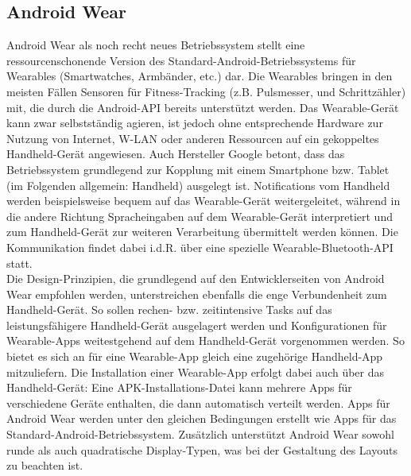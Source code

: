 \subsection{Android Wear}
Android Wear als noch recht neues Betriebssystem stellt eine ressourcenschonende Version des Standard-Android-Betriebssystems für Wearables (Smartwatches, Armbänder, etc.) dar. Die Wearables bringen in den meisten Fällen Sensoren für Fitness-Tracking (z.B. Pulsmesser, und Schrittzähler) mit, die durch die Android-API bereits unterstützt werden. Das Wearable-Gerät kann zwar selbstständig agieren, ist jedoch ohne entsprechende Hardware zur Nutzung von Internet, W-LAN oder anderen Ressourcen auf ein gekoppeltes Handheld-Gerät angewiesen. Auch Hersteller Google betont, dass das Betriebssystem grundlegend zur Kopplung mit einem Smartphone bzw. Tablet (im Folgenden allgemein: Handheld) ausgelegt ist. Notifications vom Handheld werden beispielsweise bequem auf das Wearable-Gerät weitergeleitet, während in die andere Richtung Spracheingaben auf dem Wearable-Gerät interpretiert und zum Handheld-Gerät zur weiteren Verarbeitung übermittelt werden können. Die Kommunikation findet dabei i.d.R. über eine spezielle Wearable-Bluetooth-API statt.
\\[0.5cm]
Die Design-Prinzipien, die grundlegend auf den Entwicklerseiten von Android Wear\cite{android-wear-dev} empfohlen werden, unterstreichen ebenfalls die enge Verbundenheit zum Handheld-Gerät. So sollen rechen- bzw. zeitintensive Tasks auf das leistungsfähigere Handheld-Gerät ausgelagert werden und Konfigurationen für Wearable-Apps weitestgehend auf dem Handheld-Gerät vorgenommen werden. So bietet es sich an für eine Wearable-App gleich eine zugehörige Handheld-App mitzuliefern. Die Installation einer Wearable-App erfolgt dabei auch über das Handheld-Gerät: Eine APK-Installations-Datei kann mehrere Apps für verschiedene Geräte enthalten, die dann automatisch verteilt werden. Apps für Android Wear werden unter den gleichen Bedingungen erstellt wie Apps für das Standard-Android-Betriebssystem. Zusätzlich unterstützt Android Wear sowohl runde als auch quadratische Display-Typen, was bei der Gestaltung des Layouts zu beachten ist.

